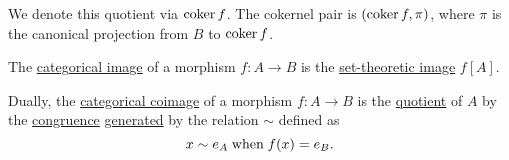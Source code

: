 \begin{proposition}
\begin{thmenum}
    We denote this quotient via \( \operatorname*{co\negthinspace\ker} f \). The cokernel pair is \( (\operatorname*{co\negthinspace\ker} f, \pi) \), where \( \pi \) is the canonical projection from \( B \) to \( \operatorname*{co\negthinspace\ker} f \).

     The \hyperref[def:zero_morphisms/image]{categorical image} of a morphism \( f: A \to B \) is the \hyperref[def:set_valued_map/image]{set-theoretic image} \( f[A] \).

     Dually, the \hyperref[def:zero_morphisms/coimage]{categorical coimage} of a morphism \( f: A \to B \) is the \hyperref[def:first_order_quotient]{quotient} of \( A \) by the \hyperref[def:first_order_congruence]{congruence} \hyperref[def:first_order_generated_congruence]{generated} by the relation \( {\sim} \) defined as
    \begin{equation*}
      x \sim e_A \T{when} f(x) = e_B.
    \end{equation*}
  \end{thmenum}
\end{proposition}
